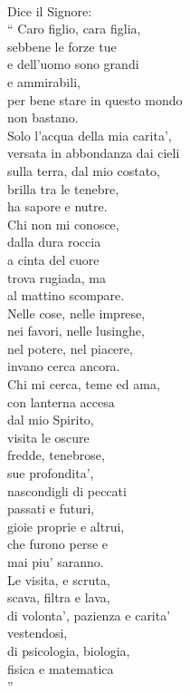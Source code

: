 \begin{haiku}
\leavevmode\\
Dice il Signore: \\\enquote{
Caro figlio, cara figlia,\\
sebbene le forze tue \\
e dell'uomo sono grandi \\
e ammirabili, \\
per bene stare in questo mondo \\
non bastano.\\
Solo l'acqua della mia carita', \\
versata in abbondanza dai cieli\\
sulla terra, dal mio costato,\\
brilla tra le tenebre, \\
ha sapore e nutre.\\
Chi non mi conosce,\\
dalla dura roccia \\
a cinta del cuore\\
trova rugiada, ma\\
al mattino scompare.\\
Nelle cose, nelle imprese,\\
nei favori, nelle lusinghe,\\
nel potere, nel piacere, \\
invano cerca ancora.\\
Chi mi cerca, teme ed ama,\\
con lanterna accesa\\
dal mio Spirito,\\
visita le oscure\\
fredde, tenebrose, \\
sue profondita', \\
nascondigli  di peccati \\
passati  e futuri,\\
gioie proprie e altrui,\\
che furono perse e\\
mai piu' saranno.\\
Le visita, e scruta,\\
scava, filtra e lava,\\
di volonta', pazienza e carita'\\
vestendosi,\\
di psicologia, biologia,\\
fisica e matematica\\
}
\end{haiku}

